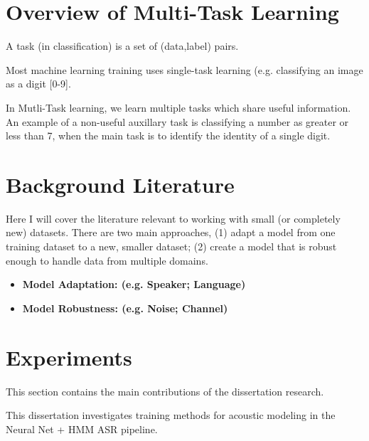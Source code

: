 \documentclass[10pt,a4paper]{article}
\begin{document}
\newpage

\section{Overview of Multi-Task Learning}

A task (in classification) is a set of (data,label) pairs.

Most machine learning training uses single-task learning (e.g. classifying an image as a digit [0-9].

In Mutli-Task learning, we learn multiple tasks which share useful information. An example of a non-useful auxillary task is classifying a number as greater or less than 7, when the main task is to identify the identity of a single digit.






\newpage

\section{Background Literature}

Here I will cover the literature relevant to working with small (or completely new) datasets. There are two main approaches, (1) adapt a model from one training dataset to a new, smaller dataset; (2) create a model that is robust enough to handle data from multiple domains. 

\begin{itemize}

\item \textbf{Model Adaptation: (e.g. Speaker; Language)}

    
  
\item \textbf{Model Robustness: (e.g. Noise; Channel)}

  
\end{itemize}



\newpage

\section{Experiments}

This section contains the main contributions of the dissertation research.

This dissertation investigates training methods for acoustic modeling in the Neural Net + HMM ASR pipeline.
\end{document}
